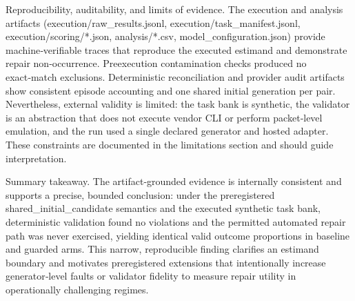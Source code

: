 \documentclass[conference]{IEEEtran}
\begin{document}
Reproducibility, auditability, and limits of evidence. The execution and analysis artifacts (execution/raw\_results.jsonl, execution/task\_manifest.jsonl, execution/scoring/*.json, analysis/*.csv, model\_configuration.json) provide machine‑verifiable traces that reproduce the executed estimand and demonstrate repair non‑occurrence. Preexecution contamination checks produced no exact‑match exclusions. Deterministic reconciliation and provider audit artifacts show consistent episode accounting and one shared initial generation per pair. Nevertheless, external validity is limited: the task bank is synthetic, the validator is an abstraction that does not execute vendor CLI or perform packet‑level emulation, and the run used a single declared generator and hosted adapter. These constraints are documented in the limitations section and should guide interpretation.

Summary takeaway. The artifact‑grounded evidence is internally consistent and supports a precise, bounded conclusion: under the preregistered shared\_initial\_candidate semantics and the executed synthetic task bank, deterministic validation found no violations and the permitted automated repair path was never exercised, yielding identical valid outcome proportions in baseline and guarded arms. This narrow, reproducible finding clarifies an estimand boundary and motivates preregistered extensions that intentionally increase generator‑level faults or validator fidelity to measure repair utility in operationally challenging regimes.
\end{document}

